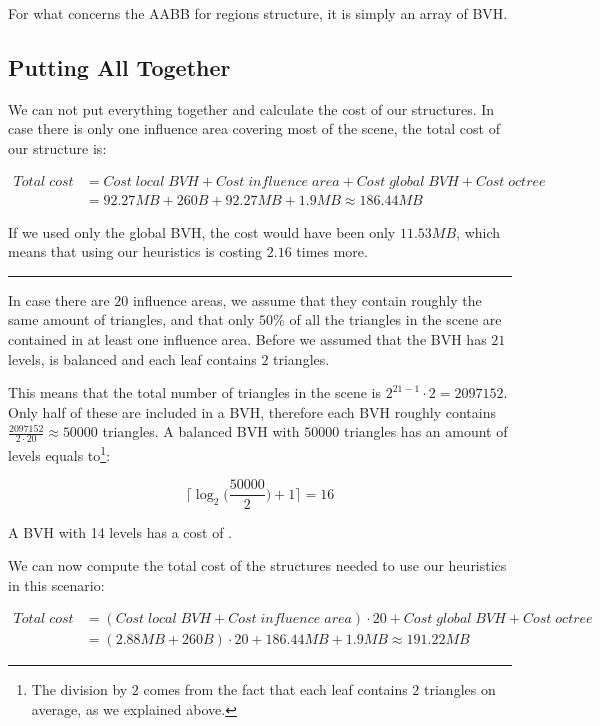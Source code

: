 \documentclass{PoliMi_MasterThesis}
\begin{document}
For what concerns the AABB for regions structure, it is simply an array of BVH.

\subsection*{Putting All Together}
We can not put everything together and calculate the cost of our structures. In case there is only one influence area covering most of the scene, the total cost of our structure is:

\begin{subequations}
	\begin{align*}
	Total\;cost &= Cost\;local\;BVH + Cost\;influence\;area + Cost\;global\;BVH + Cost\;octree\\
	&= 92.27MB + 260B + 92.27MB + 1.9MB \approx 186.44MB
	\end{align*}
\end{subequations}

If we used only the global BVH, the cost would have been only $11.53MB$, which means that using our heuristics is costing $2.16$ times more.

\noindent\rule{\textwidth}{1pt}
In case there are $20$ influence areas, we assume that they contain roughly the same amount of triangles, and that only $50\%$ of all the triangles in the scene are contained in at least one influence area. Before we assumed that the BVH has $21$ levels, is balanced and each leaf contains $2$ triangles. 

This means that the total number of triangles in the scene is $2^{21-1} \cdot 2 = 2097152$. Only half of these are included in a BVH, therefore each BVH roughly contains $\frac{2097152}{2\cdot 20} \approx 50000$ triangles. A balanced BVH with $50000$ triangles has an amount of levels equals to\footnote{The division by $2$ comes from the fact that each leaf contains $2$ triangles on average, as we explained above.}:

$$\Big\lceil\log_2\Big(\frac{50000}{2}\Big)+1\Big\rceil = 16$$ 

A BVH with 14 levels has a cost of \unboldmath.

We can now compute the total cost of the structures needed to use our heuristics in this scenario:

\begin{subequations}
	\begin{align*}
		Total\;cost &= (Cost\;local\;BVH + Cost\;influence\;area) \cdot 20 + Cost\;global\;BVH + Cost\;octree\\
		&= (2.88MB + 260B) \cdot 20 + 186.44MB + 1.9MB \approx 191.22MB
	\end{align*}
\end{subequations}
\end{document}
